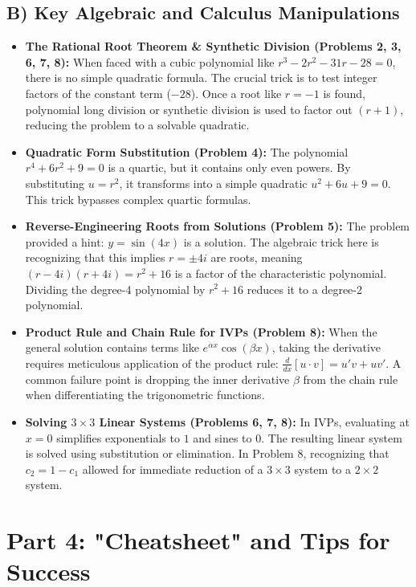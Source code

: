 \documentclass[11pt, a4paper]{article}
\theoremstyle{definition}
\theoremstyle{remark}
\begin{document}
\subsection{B) Key Algebraic and Calculus Manipulations}
\begin{itemize}
    \item \textbf{The Rational Root Theorem \& Synthetic Division (Problems 2, 3, 6, 7, 8):} When faced with a cubic polynomial like $r^3 - 2r^2 - 31r - 28 = 0$, there is no simple quadratic formula. The crucial trick is to test integer factors of the constant term ($-28$). Once a root like $r=-1$ is found, polynomial long division or synthetic division is used to factor out $(r+1)$, reducing the problem to a solvable quadratic.
    \item \textbf{Quadratic Form Substitution (Problem 4):} The polynomial $r^4 + 6r^2 + 9 = 0$ is a quartic, but it contains only even powers. By substituting $u = r^2$, it transforms into a simple quadratic $u^2 + 6u + 9 = 0$. This trick bypasses complex quartic formulas.
    \item \textbf{Reverse-Engineering Roots from Solutions (Problem 5):} The problem provided a hint: $y = \sin(4x)$ is a solution. The algebraic trick here is recognizing that this implies $r = \pm 4i$ are roots, meaning $(r - 4i)(r + 4i) = r^2 + 16$ is a factor of the characteristic polynomial. Dividing the degree-4 polynomial by $r^2 + 16$ reduces it to a degree-2 polynomial.
    \item \textbf{Product Rule and Chain Rule for IVPs (Problem 8):} When the general solution contains terms like $e^{\alpha x} \cos(\beta x)$, taking the derivative requires meticulous application of the product rule: $\frac{d}{dx}[u \cdot v] = u'v + uv'$. A common failure point is dropping the inner derivative $\beta$ from the chain rule when differentiating the trigonometric functions.
    \item \textbf{Solving $3 \times 3$ Linear Systems (Problems 6, 7, 8):} In IVPs, evaluating at $x=0$ simplifies exponentials to $1$ and sines to $0$. The resulting linear system is solved using substitution or elimination. In Problem 8, recognizing that $c_2 = 1 - c_1$ allowed for immediate reduction of a $3 \times 3$ system to a $2 \times 2$ system.
\end{itemize}

\newpage
\section{Part 4: "Cheatsheet" and Tips for Success}
\end{document}
